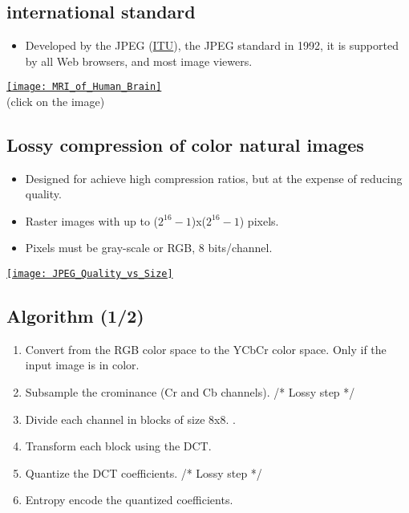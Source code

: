 \chapter{}

\section{ international standard}
\begin{itemize}
\item Developed by the \gls{JPEG} (\href{https://www.itu.int}{ITU}),
  the \gls{JPEG} standard \cite{ccitt.t81} in 1992, it is supported by
  all Web browsers, and most image viewers.
\end{itemize}
\vspace{-2ex}
\begin{center}
  \href{https://en.wikipedia.org/wiki/Magnetic_resonance_imaging_of_the_brain#/media/File:MRI_of_Human_Brain.jpg}{\texttt{[image: MRI\_of\_Human\_Brain]}}\\
  (click on the image)
\end{center}

\section{Lossy compression of color natural images}
\begin{itemize}
\item Designed for achieve high compression ratios, but at the expense of reducing quality.
  \item Raster images with up to ($2^{16}-1$)x($2^{16}-1$) pixels.
  \item Pixels must be gray-scale or \gls{RGB}, 8 bits/channel.
\end{itemize}
\vspace{-2ex}
\begin{center}
  \href{https://www.thewebmaster.com/jpeg-definitive-guide/}{\texttt{[image: JPEG\_Quality\_vs\_Size]}}
\end{center}

\section{Algorithm (1/2)}
\begin{enumerate}
\item Convert from the \gls{RGB} color space to the \gls{YCbCr} color
  space. Only if the input image is in color.
\item Subsample the crominance (Cr and Cb channels). /* Lossy step */
\item Divide each channel in blocks of size 8x8. .
\item Transform each block using the \gls{DCT}.
\item Quantize the \gls{DCT} coefficients. /* Lossy step */
\item Entropy encode the quantized coefficients.
\end{enumerate}

